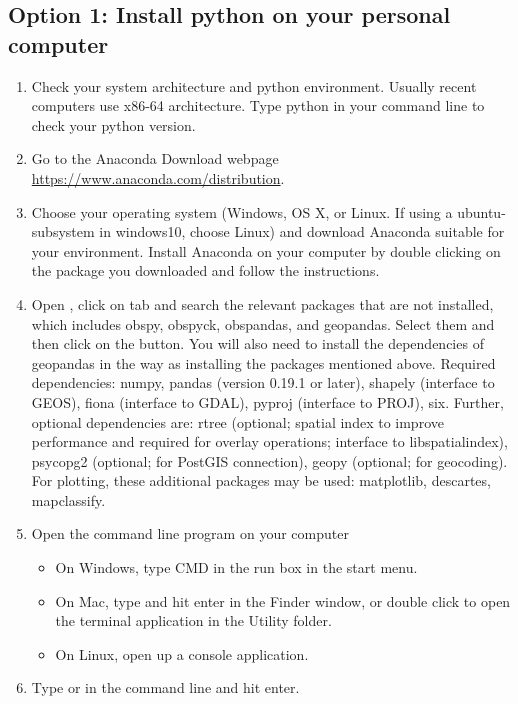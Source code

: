 \documentclass[12pt]{article}   	%
\begin{document}
\subsection*{Option 1: Install python on your personal computer}
\begin{enumerate}[noitemsep]
\item Check your system architecture and python environment. Usually recent computers use x86-64 architecture. Type python in your command line to check your python version.
\item Go to the Anaconda Download webpage \href{https://www.anaconda.com/distribution}{https://www.anaconda.com/distribution}.
\item Choose your operating system (Windows, OS X, or Linux. If using a ubuntu-subsystem in windows10, choose Linux) and download Anaconda suitable for your environment.
Install Anaconda on your computer by double clicking on the package you downloaded and follow the instructions.
\item Open ,  click on  tab and search the relevant packages that are not installed, which includes
obspy, obspyck, obspandas, and geopandas. Select them and then click on the  button. You will also need to install the dependencies of 
geopandas in the way as installing the packages mentioned above. Required dependencies: numpy, pandas (version 0.19.1 or later), shapely (interface to GEOS),
fiona (interface to GDAL), pyproj (interface to PROJ), six. Further, optional dependencies are: rtree 
(optional; spatial index to improve performance and required for overlay operations; interface to libspatialindex), psycopg2 (optional; for PostGIS connection),
geopy (optional; for geocoding). For plotting, these additional packages may be used: matplotlib, descartes, mapclassify.

\item Open the command line program on your computer
\begin{itemize}[noitemsep]
\item On Windows, type CMD in the run box in the start menu.
\item On Mac, type  and hit enter in the Finder window, or double click to open the terminal application in the Utility folder.
\item On Linux, open up a console application.
\end{itemize}
\item Type  or  in the command line and hit enter.
\end{enumerate}
\end{document}
